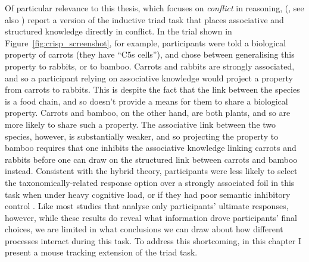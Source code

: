 Of particular relevance to this thesis, which focuses on \emph{conflict} in reasoning,
\citeauthor{Bright} (\citeyear{Bright}, see also \citealp[Chapter 5]{Crisp-Bright2010})
report a version of the inductive triad task \citep{Gelman1986}
that places associative and structured knowledge directly in conflict.
In the trial shown in Figure~\ref{fig:crisp_screenshot}, for example,
participants were told a biological property of carrots (they have ``C5s cells''),
and chose between generalising this property to rabbits, or to bamboo.
Carrots and rabbits are strongly associated,
and so a participant relying on associative knowledge
would project a property from carrots to rabbits.
This is despite the fact that the link between the species is a food chain,
and so doesn't provide a means for them to share a biological property.
Carrots and bamboo, on the other hand, are both plants,
and so are more likely to share such a property.
The associative link between the two species, however,
is substantially weaker, and so projecting the property to bamboo
requires that one inhibits the associative knowledge linking carrots and rabbits
before one can draw on the structured link between carrots and bamboo instead.
Consistent with the hybrid theory,
participants were less likely to select the
taxonomically-related response option
over a strongly associated foil in this task
when under heavy cognitive load,
or if they had poor semantic inhibitory control
\citep[a measure of their ability to inhibit
  task-irrelevant semantic information;][]{Markovits2004,Burgess1996a}.
Like most studies that analyse only participants' ultimate responses, however,
while these results do reveal what information drove participants' final choices,
we are limited in what conclusions we can draw about
how different processes interact during this task.
To address this shortcoming, in this chapter I present
a mouse tracking extension of the \citet{Bright} triad task.

